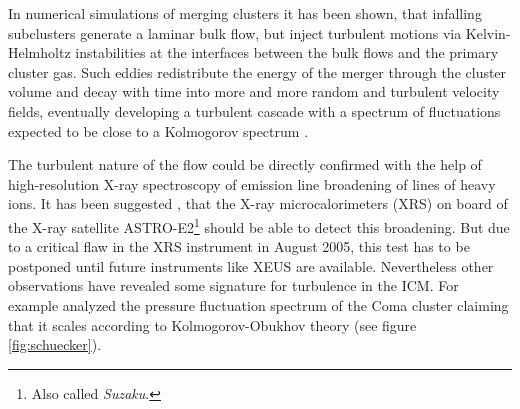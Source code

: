 In numerical simulations of merging clusters \citep{Schindler1993, 
Roettiger1997,Ricker2001,Takizawa2005} it has been shown, that infalling
subclusters generate a laminar bulk flow, but inject turbulent motions via
Kelvin-Helmholtz instabilities at the interfaces between the bulk flows and the
primary cluster gas. Such eddies redistribute the energy of the merger through
the cluster volume and decay with time into more and more random and turbulent
velocity fields, eventually developing a turbulent cascade with a spectrum of
fluctuations expected to be close to a Kolmogorov spectrum \citep{Dolag2005}. 

The turbulent nature of the flow could be directly confirmed with the help of
high-resolution X-ray spectroscopy of emission line broadening of lines of
heavy ions. It has been suggested \citep{Sunyaev2003}, that the X-ray
microcalorimeters (XRS) on board of the X-ray satellite ASTRO-E2\footnote{Also
called \emph{Suzaku}.} should be able to detect this broadening. But due to a
critical flaw in the XRS instrument in August 2005, this test has to be
postponed until future instruments like XEUS are available. Nevertheless other
observations have revealed some signature for turbulence in the ICM.
For example \citet{Schuecker2004} analyzed the pressure
fluctuation spectrum of the Coma cluster claiming that it scales according to
Kolmogorov-Obukhov theory (see figure \ref{fig:schuecker}).

